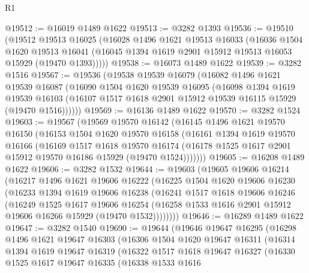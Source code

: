 \begin{lexlean}{R1}
\begin{coremodule}
@19512 := @16019 @1489 @1622
@19513 := @3282 @1393
@19536 := @19510
    (@19512
      @19513
      @16025
      (@16028
        @1496
        @1621
        @19513
        @16033
        (@16036
          @1504
          @1620
          @19513
          @16041
          (@16045 @1394 @1619 @2901 @15912 @19513 @16053 @15929 (@19470 @1393)))))
@19538 := @16073 @1489 @1622
@19539 := @3282 @1516
@19567 := @19536
    (@19538
      @19539
      @16079
      (@16082
        @1496
        @1621
        @19539
        @16087
        (@16090
          @1504
          @1620
          @19539
          @16095
          (@16098
            @1394
            @1619
            @19539
            @16103
            (@16107 @1517 @1618 @2901 @15912 @19539 @16115 @15929 (@19470 @1516))))))
@19569 := @16136 @1489 @1622
@19570 := @3282 @1524
@19603 := @19567
    (@19569
      @19570
      @16142
      (@16145
        @1496
        @1621
        @19570
        @16150
        (@16153
          @1504
          @1620
          @19570
          @16158
          (@16161
            @1394
            @1619
            @19570
            @16166
            (@16169
              @1517
              @1618
              @19570
              @16174
              (@16178 @1525 @1617 @2901 @15912 @19570 @16186 @15929 (@19470 @1524)))))))
@19605 := @16208 @1489 @1622
@19606 := @3282 @1532
@19644 := @19603
    (@19605
      @19606
      @16214
      (@16217
        @1496
        @1621
        @19606
        @16222
        (@16225
          @1504
          @1620
          @19606
          @16230
          (@16233
            @1394
            @1619
            @19606
            @16238
            (@16241
              @1517
              @1618
              @19606
              @16246
              (@16249
                @1525
                @1617
                @19606
                @16254
                (@16258 @1533 @1616 @2901 @15912 @19606 @16266 @15929 (@19470 @1532))))))))
@19646 := @16289 @1489 @1622
@19647 := @3282 @1540
@19690 := @19644
    (@19646
      @19647
      @16295
      (@16298
        @1496
        @1621
        @19647
        @16303
        (@16306
          @1504
          @1620
          @19647
          @16311
          (@16314
            @1394
            @1619
            @19647
            @16319
            (@16322
              @1517
              @1618
              @19647
              @16327
              (@16330
                @1525
                @1617
                @19647
                @16335
                (@16338
                  @1533
                  @1616

\end{coremodule}
\end{lexlean}
